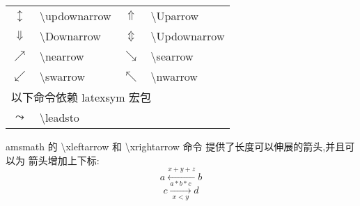 \documentclass[a4paper]{ctexart}
\begin{document}
\begin{table}[H]
\begin{tabular}{clcl}
            $\updownarrow$          & \textbackslash updownarrow                        & $\Uparrow$                  & \textbackslash Uparrow              \\
            $\Downarrow$            & \textbackslash Downarrow                          & $\Updownarrow$              & \textbackslash Updownarrow          \\
            $\nearrow$              & \textbackslash nearrow                            & $\searrow$                  & \textbackslash searrow              \\
            $\swarrow$              & \textbackslash swarrow                            & $\nwarrow$                  & \textbackslash nwarrow              \\
            \midrule
            \multicolumn{4}{l}{以下命令依赖 latexsym 宏包} \\
            $\leadsto$              & \textbackslash leadsto                                                                                                \\
            \bottomrule
        \end{tabular}
    \end{table}
    amsmath 的 \textbackslash xleftarrow 和 \textbackslash xrightarrow 命令%
    提供了长度可以伸展的箭头,并且可以为 箭头增加上下标:
    \[ a\xleftarrow{x + y + z} b \]
    \[ c\xrightarrow[x < y]{a*b*c} d \]
\end{document}
